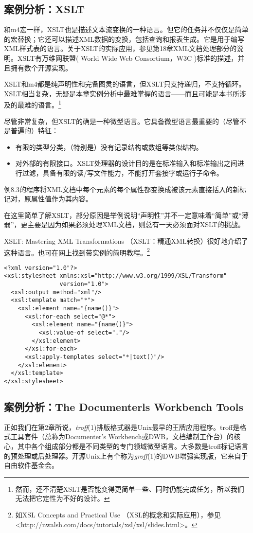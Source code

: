 \documentclass[12pt,oneside]{book}
\begin{document}
\begin{common-format}
\subsection{案例分析：XSLT}
和m4宏一样，XSLT也是描述文本流变换的一种语言。但它的任务并不仅仅是简单的宏替换；它还可以描述XML数据的变换，包括查询和报表生成。它是用于编写XML样式表的语言。关于XSLT的实际应用，参见第18章XML文档处理部分的说明。XSLT有万维网联盟( World Wide Web Consortium，W3C )标准的描述，并且拥有数个开源实现。

XSLT和m4都是纯声明性和完备图灵的语言，但XSLT只支持递归，不支持循环。XSLT相当复杂，无疑是本章实例分析中最难掌握的语言——而且可能是本书所涉及的最难的语言。\footnote{然而，还不清楚XSLT是否能变得更简单一些、同时仍能完成任务，所以我们无法把它定性为不好的设计。}

尽管非常复杂，但XSLT的确是一种微型语言。它具备微型语言最重要的（尽管不是普遍的）特征：
\begin{itemize}
\item 有限的类型分类，（特别是）没有记录结构或数组等类似结构。
\item 对外部的有限接口。XSLT处理器的设计目的是在标准输入和标准输出之间进行过滤，具备有限的读/写文件能力，不能打开套接字或运行子命令。
\end{itemize}

例8.3的程序将XML文档中每个元素的每个属性都变换成被该元素直接括入的新标记对，原属性值作为其内容。

在这里简单了解XSLT，部分原因是举例说明“声明性”并不一定意味着“简单”或“薄弱”，更主要是因为如果必须处理XML文档，则总有一天必须面对XSLT的挑战。

XSLT: Mastering XML Transformations （XSLT：精通XML转换）\cite{Tidwell}很好地介绍了这种语言。也可在网上找到带实例的简明教程。\footnote{如XSL Concepts and Practical Use （XSL的概念和实际应用），参见<http://nwalsh.com/docs/tutorials/xsl/xsl/slides.html>。}


\begin{Verbatim}[label=例 8.3 XSLT程序实例]
<?xml version="1.0"?>
<xsl:stylesheet xmlns:xsl="http://www.w3.org/1999/XSL/Transform" 
                version="1.0">
  <xsl:output method="xml"/>
  <xsl:template match="*">
    <xsl:element name="{name()}">
      <xsl:for-each select="@*">
        <xsl:element name="{name()}">
          <xsl:value-of select="."/>
        </xsl:element>
      </xsl:for-each>
      <xsl:apply-templates select="*|text()"/>
    </xsl:element>
  </xsl:template> 
</xsl:stylesheet>
\end{Verbatim}


\subsection{案例分析：The Documenterls Workbench Tools}
正如我们在第2章所说，\textit{troff}(1)排版格式器是Unix最早的王牌应用程序。troff是格式工具套件（总称为Documenter's Workbench或DWB，文档编制工作台）的核心，其中各个组成部分都是不同类型的专门领域微型语言。大多数是troff标记语言的预处理或后处理器。开源Unix上有个称为\textit{groff}(1)的DWB增强实现版，它来自于自由软件基金会。


\end{common-format}
\end{document}

